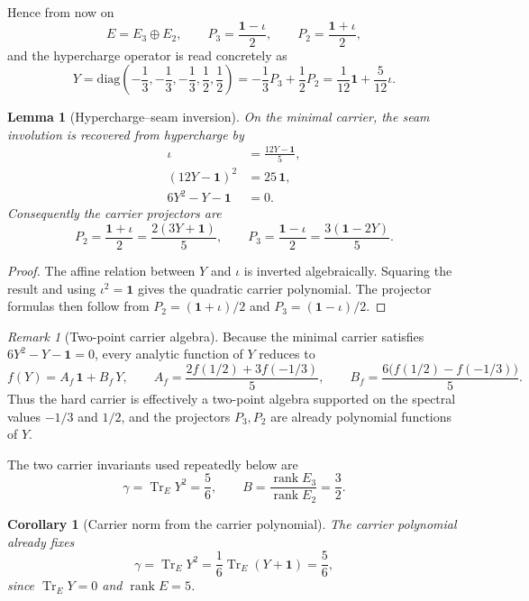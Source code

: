 \documentclass[11pt,a4paper]{article}
\newtheorem{corollary}[theorem]{Corollary}
\newtheorem{lemma}[theorem]{Lemma}
\theoremstyle{definition}
\theoremstyle{remark}
\newtheorem*{remark}{Remark}
\DeclareMathOperator{\tr}{Tr}
\DeclareMathOperator{\rank}{rank}
\newcommand{\inv}{\iota}
\begin{document}
Hence from now on
\[
E=E_3\oplus E_2,
\qquad
P_3=\frac{\mathbf 1-\inv}{2},
\qquad
P_2=\frac{\mathbf 1+\inv}{2},
\]
and the hypercharge operator is read concretely as
\begin{equation}
\label{eq:explicit-hypercharge}
Y
=
\mathrm{diag}\!\left(-\frac13,-\frac13,-\frac13,\frac12,\frac12\right)
=
-\frac13 P_3+\frac12 P_2
=
\frac1{12}\mathbf 1+\frac5{12}\inv.
\end{equation}

\begin{lemma}[Hypercharge--seam inversion]
On the minimal carrier, the seam involution is recovered from hypercharge by
\begin{align}
\inv&=\frac{12Y-\mathbf 1}{5},
\label{eq:hypercharge-seam-inversion}\\
(12Y-\mathbf 1)^2&=25\,\mathbf 1,
\nonumber\\
6Y^2-Y-\mathbf 1&=0.
\label{eq:carrier-polynomial}
\end{align}
Consequently the carrier projectors are
\[
P_2=\frac{\mathbf 1+\inv}{2}=\frac{2(3Y+\mathbf 1)}{5},
\qquad
P_3=\frac{\mathbf 1-\inv}{2}=\frac{3(\mathbf 1-2Y)}{5}.
\]
\end{lemma}

\begin{proof}
The affine relation between $Y$ and $\inv$ is inverted algebraically. Squaring the result and using $\inv^2=\mathbf 1$ gives the quadratic carrier polynomial. The projector formulas then follow from $P_2=(\mathbf 1+\inv)/2$ and $P_3=(\mathbf 1-\inv)/2$.
\end{proof}

\begin{remark}[Two-point carrier algebra]
Because the minimal carrier satisfies $6Y^2-Y-\mathbf 1=0$, every analytic function of $Y$ reduces to
\[
f(Y)=A_f\,\mathbf 1+B_f\,Y,
\qquad
A_f=\frac{2f(1/2)+3f(-1/3)}{5},
\qquad
B_f=\frac{6\bigl(f(1/2)-f(-1/3)\bigr)}{5}.
\]
Thus the hard carrier is effectively a two-point algebra supported on the spectral values $-1/3$ and $1/2$, and the projectors $P_3,P_2$ are already polynomial functions of $Y$.
\end{remark}

The two carrier invariants used repeatedly below are
\[
\gamma=\tr_EY^2=\frac56,
\qquad
B=\frac{\rank E_3}{\rank E_2}=\frac32.
\]
\begin{corollary}[Carrier norm from the carrier polynomial]
The carrier polynomial already fixes
\[
\gamma=\tr_EY^2=\frac16\tr_E(Y+\mathbf 1)=\frac56,
\]
since $\tr_EY=0$ and $\rank E=5$.
\end{corollary}
\end{document}
